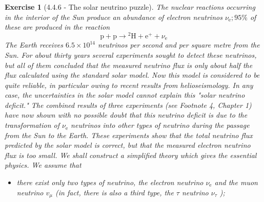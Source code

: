 \documentclass[12pt]{article}
\newtheorem{exercise}{Exercise}
\begin{document}
	\begin{exercise}[4.4.6 - The solar neutrino puzzle] \label{ex4.4.6}
		The nuclear reactions occurring in the interior of the Sun produce an abundance of electron neutrinos $\nu_{\mathrm{e}} ; 95 \%$ of these are produced in the reaction
		$$
		\mathrm{p}+\mathrm{p} \rightarrow{ }^{2} \mathrm{H}+\mathrm{e}^{+}+\nu_{\mathrm{e}}
		$$
		The Earth receives $6.5 \times 10^{14}$ neutrinos per second and per square metre from the Sun. For about thirty years several experiments sought to detect these neutrinos, but all of them concluded that the measured neutrino flux is only about half the flux calculated using the standard solar model. Now this model is considered to be quite reliable, in particular owing to recent results from helioseismology. In any case, the uncertainties in the solar model cannot explain this "solar neutrino deficit." The combined results of three experiments (see Footnote 4, Chapter 1) have now shown with no possible doubt that this neutrino deficit is due to the transformation of $\nu_{\mathrm{e}}$ neutrinos into other types of neutrino during the passage from the Sun to the Earth. These experiments show that the total neutrino flux predicted by the solar model is correct, but that the measured electron neutrino flux is too small. We shall construct a simplified theory which gives the essential physics. We assume that
		\begin{itemize}
			\item there exist only two types of neutrino, the electron neutrino $\nu_{\mathrm{e}}$ and the muon neutrino $v_{\mu}$ (in fact, there is also a third type, the $\tau$ neutrino $\nu_{\tau}$ );
		

\end{itemize}
\end{exercise}
\end{document}
